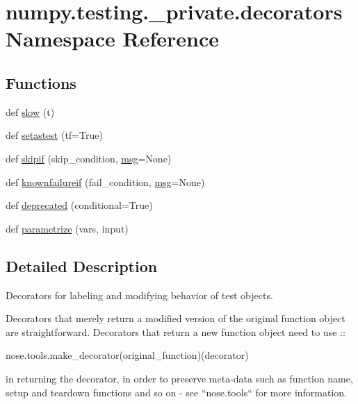 \hypertarget{namespacenumpy_1_1testing_1_1__private_1_1decorators}{}\section{numpy.\+testing.\+\_\+private.\+decorators Namespace Reference}
\label{namespacenumpy_1_1testing_1_1__private_1_1decorators}
\subsection*{Functions}
\begin{DoxyCompactItemize}
\item 
def \hyperlink{namespacenumpy_1_1testing_1_1__private_1_1decorators_a6e89bc2d3f956de807a5413afee38bd5}{slow} (t)
\item 
def \hyperlink{namespacenumpy_1_1testing_1_1__private_1_1decorators_a1507a52f3f465b8f127fe6c639e09d02}{setastest} (tf=True)
\item 
def \hyperlink{namespacenumpy_1_1testing_1_1__private_1_1decorators_a959e2eca3bd6bd2d50ab3a1c4d05faa3}{skipif} (skip\+\_\+condition, \hyperlink{namespacenumpy_ab96122eb8e44294b488b0ef93ec27d38}{msg}=None)
\item 
def \hyperlink{namespacenumpy_1_1testing_1_1__private_1_1decorators_aad1876fbbd179bf5da34024026d008f6}{knownfailureif} (fail\+\_\+condition, \hyperlink{namespacenumpy_ab96122eb8e44294b488b0ef93ec27d38}{msg}=None)
\item 
def \hyperlink{namespacenumpy_1_1testing_1_1__private_1_1decorators_a8c284617f70345ce6ded679abb07aaa9}{deprecated} (conditional=True)
\item 
def \hyperlink{namespacenumpy_1_1testing_1_1__private_1_1decorators_aa6cf833d5d841e31f13cc84d4228d78a}{parametrize} (vars, input)
\end{DoxyCompactItemize}


\subsection{Detailed Description}
\begin{DoxyVerb}Decorators for labeling and modifying behavior of test objects.

Decorators that merely return a modified version of the original
function object are straightforward. Decorators that return a new
function object need to use
::

  nose.tools.make_decorator(original_function)(decorator)

in returning the decorator, in order to preserve meta-data such as
function name, setup and teardown functions and so on - see
``nose.tools`` for more information.\end{DoxyVerb}
 

